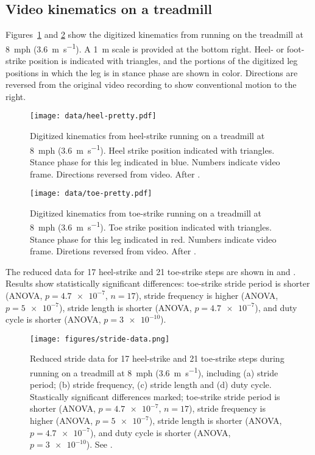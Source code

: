 \subsection{Video kinematics on a treadmill}
Figures~\ref{fig:results:heelpretty} and \ref{fig:results:toepretty} show the digitized kinematics from running on the treadmill at \SI{8}{mph} (\SI{3.6}{\meter\per\second}). A \SI{1}{\meter} scale is provided at the bottom right. Heel- or foot-strike position is indicated with triangles, and the portions of the digitized leg positions in which the leg is in stance phase are shown in color. Directions are reversed from the original video recording to show conventional motion to the right. 
\begin{figure}[p]
\begin{center}
\texttt{[image: data/heel-pretty.pdf]}
\end{center}
\caption{Digitized kinematics from heel-strike running on a treadmill at \SI{8}{mph} (\SI{3.6}{\meter\per\second}). Heel strike position indicated with triangles. Stance phase for this leg indicated in blue. Numbers indicate video frame. Directions reversed from video. After \citep{marey1873locomotion, muybridge1901human}.}  
\label{fig:results:heelpretty}
\end{figure}

\begin{figure}[p]
\begin{center}
\texttt{[image: data/toe-pretty.pdf]}
\end{center}
\caption{Digitized kinematics from toe-strike running on a treadmill at \SI{8}{mph} (\SI{3.6}{\meter\per\second}). Toe strike position indicated with triangles. Stance phase for this leg indicated in red. Numbers indicate video frame. Diretions reversed from video. After \citep{marey1873locomotion, muybridge1901human}.}  
\label{fig:results:toepretty}
\end{figure}

The reduced data for 17 heel-strike and 21 toe-strike steps are shown in  and . Results show statistically significant differences: toe-strike stride period is shorter (ANOVA, $p=\num{4.7e-7}$, $n=17$), stride frequency is higher (ANOVA, $p=\num{5e-7}$), stride length is shorter (ANOVA, $p=\num{4.7e-7}$), and duty cycle is shorter (ANOVA, $p=\num{3e-10}$).
\begin{figure}
\begin{center}
\texttt{[image: figures/stride-data.png]}
\end{center}
\caption{Reduced stride data for 17 heel-strike and 21 toe-strike steps during running on a treadmill at \SI{8}{mph} (\SI{3.6}{\meter\per\second}), including (a) stride period; (b) stride frequency, (c) stride length and (d) duty cycle. Stastically significant differences marked; toe-strike stride period is shorter (ANOVA, $p=\num{4.7e-7}$, $n=17$), stride frequency is higher (ANOVA, $p=\num{5e-7}$), stride length is shorter (ANOVA, $p=\num{4.7e-7}$), and duty cycle is shorter (ANOVA, $p=\num{3e-10}$). See .} 
\label{fig:results:stride}
\end{figure}

